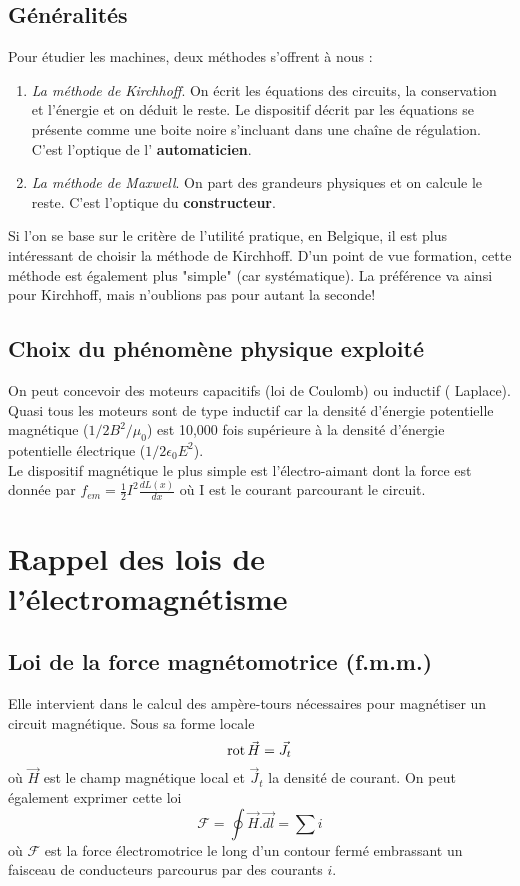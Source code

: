 	\subsection{Généralités}
	Pour étudier les machines, deux méthodes s'offrent à nous :
	\begin{enumerate}
	\item \textit{La méthode de Kirchhoff}. On écrit les équations des 
	circuits, la conservation et l'énergie et on déduit le reste. Le 
	dispositif décrit par les équations se présente comme une boite noire 
	s'incluant dans une chaîne de régulation. C'est l'optique de l'
	\textbf{automaticien}.
	\item \textit{La méthode de Maxwell}. On part des grandeurs physiques 
	et on calcule le reste. C'est l'optique du \textbf{constructeur}.
	\end{enumerate}
	Si l'on se base sur le critère de l'utilité pratique, en Belgique, il 
	est plus intéressant de choisir la méthode de Kirchhoff. D'un point de 
	vue formation, cette méthode est également plus "simple" (car 
	systématique). La préférence va ainsi pour Kirchhoff, mais n'oublions 
	pas pour autant la seconde!
	
	\subsection{Choix du phénomène physique exploité}
	On peut concevoir des moteurs capacitifs (loi de Coulomb) ou inductif (
	Laplace). Quasi tous les moteurs sont de type inductif car la densité 
	d'énergie potentielle magnétique ($1/2B^2/\mu_0$) est 10,000 fois 
	supérieure à la densité d'énergie potentielle électrique ($1/2\epsilon_0
	E^2$).\\
	Le dispositif magnétique le plus simple est l'électro-aimant dont 
	la force est donnée par $f_{em} = \frac{1}{2} I^2\frac{dL(x)}{dx}$ où I 
	est le courant parcourant le circuit.
	
	
	
\section{Rappel des lois de l'électromagnétisme}
	\subsection{Loi de la force magnétomotrice (f.m.m.)}
	Elle intervient dans le calcul des ampère-tours nécessaires pour 
	magnétiser un circuit magnétique. Sous sa forme locale 
	\begin{equation}
	\rot \vec{H} = \vec{J}_t
	\end{equation}
	où $\vec{H}$ est le champ magnétique local et $\vec{J}_t$ la 
	densité de courant. On peut également exprimer cette loi 
	\begin{equation}
	\mathcal{F} = \oint \vec{H}.\vec{dl} = \sum i
	\end{equation}
	où $\mathcal{F}$ est la force électromotrice le long d'un contour 
	fermé embrassant un faisceau de conducteurs parcourus par des 
	courants $i$.
	
